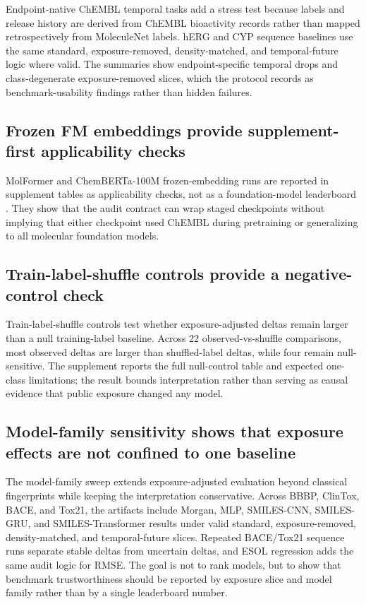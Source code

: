 \documentclass[unnumsec,webpdf,contemporary,large,numbered]{oup-authoring-template}
\begin{document}
Endpoint-native ChEMBL temporal tasks add a stress test because labels and release history are derived from ChEMBL bioactivity records rather than mapped retrospectively from MoleculeNet labels. hERG and CYP sequence baselines use the same standard, exposure-removed, density-matched, and temporal-future logic where valid. The summaries show endpoint-specific temporal drops and class-degenerate exposure-removed slices, which the protocol records as benchmark-usability findings rather than hidden failures.

\subsection{Frozen FM embeddings provide supplement-first applicability checks}

MolFormer and ChemBERTa-100M frozen-embedding runs are reported in supplement tables as applicability checks, not as a foundation-model leaderboard \cite{molformer2022,chemberta2020}. They show that the audit contract can wrap staged checkpoints without implying that either checkpoint used ChEMBL during pretraining or generalizing to all molecular foundation models.

\subsection{Train-label-shuffle controls provide a negative-control check}

Train-label-shuffle controls test whether exposure-adjusted deltas remain larger than a null training-label baseline. Across 22 observed-vs-shuffle comparisons, most observed deltas are larger than shuffled-label deltas, while four remain null-sensitive. The supplement reports the full null-control table and expected one-class limitations; the result bounds interpretation rather than serving as causal evidence that public exposure changed any model.

\subsection{Model-family sensitivity shows that exposure effects are not confined to one baseline}

The model-family sweep extends exposure-adjusted evaluation beyond classical fingerprints while keeping the interpretation conservative. Across BBBP, ClinTox, BACE, and Tox21, the artifacts include Morgan, MLP, SMILES-CNN, SMILES-GRU, and SMILES-Transformer results under valid standard, exposure-removed, density-matched, and temporal-future slices. Repeated BACE/Tox21 sequence runs separate stable deltas from uncertain deltas, and ESOL regression adds the same audit logic for RMSE. The goal is not to rank models, but to show that benchmark trustworthiness should be reported by exposure slice and model family rather than by a single leaderboard number.
\end{document}
